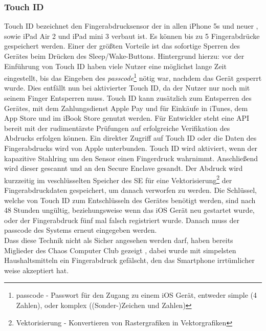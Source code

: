 	\subsubsection{Touch ID}\label{sec:touch_id}
		Touch ID bezeichnet den Fingerabdrucksensor der in allen iPhone 5s und neuer
		, sowie iPad Air 2 und iPad mini 3 verbaut ist. Es können bis zu 5
		Fingerabdrücke gespeichert werden. Einer der größten Vorteile ist das
		sofortige Sperren des Gerätes beim Drücken des Sleep/Wake-Buttons.
		Hintergrund hierzu: vor der Einführung von Touch ID haben viele Nutzer eine
		möglichst lange Zeit eingestellt, bis das Eingeben des \textsl{passcode}\footnote{passcode -
		Passwort für den Zugang zu einem iOS Gerät, entweder simple (4 Zahlen), oder
		komplex ((Sonder-)Zeichen und Zahlen)} nötig war, nachdem das Gerät gesperrt
		wurde. Dies entfällt nun bei aktivierter Touch ID, da der Nutzer nur noch mit
		seinem Finger Entsperren muss.
		Touch ID kann zusätzlich zum Entsperren des Gerätes, mit dem Zahlungsdienst
		Apple Pay und für Einkäufe in iTunes, dem App Store und im iBook Store genutzt
		werden. Für Entwickler steht eine API bereit mit der rudimentärste
		Prüfungen auf erfolgreiche Verifikation des Abdrucks erfolgen können. Ein
		direkter Zugriff auf Touch ID oder die Daten des Fingerabdrucks wird von
		Apple unterbunden. Touch ID wird aktiviert, wenn der kapazitive Stahlring um
		den Sensor einen Fingerdruck wahrnimmt. Anschließend wird dieser gescannt und
		an den Secure Enclave gesandt. Der Abdruck wird kurzzeitig im veschlüsselten
		Speicher des SE für eine Vektorisierung\footnote{Vektorisierung - Konvertieren
		von Rastergrafiken in Vektorgrafiken} der Fingerabdruckdaten gespeichert, um
		danach verworfen zu werden.
		Die Schlüssel, welche von Touch ID zum Entschlüsseln des Gerätes benötigt
		werden, sind nach 48 Stunden ungültig, beziehungsweise wenn das iOS Gerät neu
		gestartet wurde, oder der Fingerabdruck fünf mal falsch registriert wurde.
		Danach muss der passcode des Systems erneut eingegeben werden.\\
		Dass diese Technik nicht als Sicher angesehen werden darf, haben bereits
		Miglieder des Chaos Computer Club gezeigt \cite{CCCBreakTouch2015}, dabei 
		wurde mit simpelsten Haushaltsmitteln ein Fingerabdruck gefälscht, den das
		Smartphone irrtümlicher weise akzeptiert hat.
